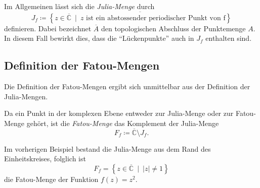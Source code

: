 \begin{definition}
Im Allgemeinen lässt sich die \emph{Julia-Menge} durch
%
\begin{equation*}
    J_f \coloneqq \overline{\left\{z \in \overline{\mathbb{C}}\:\mid\:z\text{ ist ein abstossender periodischer Punkt von f}\right\}}
\end{equation*}
definieren.
Dabei bezeichnet $\overline{A}$ den topologischen Abschluss \cite{julia:abschluss} der Punktemenge $A$.
In diesem Fall bewirkt dies, dass die ``Lückenpunkte'' auch in $J_f$ enthalten sind.
\end{definition}

\subsection{Definition der Fatou-Mengen}
Die Definition der Fatou-Mengen ergibt sich unmittelbar aus der Definition der Julia-Mengen.
\begin{definition}
Da ein Punkt in der komplexen Ebene entweder zur Julia-Menge oder zur Fatou-Menge gehört, ist die \emph{Fatou-Menge} das Komplement der Julia-Menge
%
\begin{equation*}
    F_f \coloneqq \overline{\mathbb{C}} \setminus J_f.
\end{equation*}
\end{definition}

\begin{beispiel}
Im vorherigen Beispiel bestand die Julia-Menge aus dem Rand des Einheitskreises, folglich ist
\begin{equation*}
    F_f = \left\{z \in \overline{\mathbb{C}}\:\mid\:|z| \neq 1\right\}
\end{equation*}
die Fatou-Menge der Funktion $f(z) = z^2$.
\end{beispiel}

